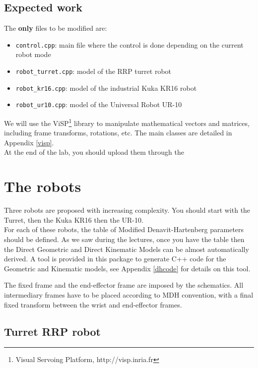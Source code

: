 \documentclass{ecnreport}
\begin{document}
\subsection{Expected work}

The {\bf only} files to be modified are:
\begin{itemize}
	\item \texttt{control.cpp}: main file where the control is done depending on the current robot mode
	\item \texttt{robot\_turret.cpp}: model of the RRP turret robot
	\item \texttt{robot\_kr16.cpp}: model of the industrial Kuka KR16 robot
	\item \texttt{robot\_ur10.cpp}: model of the Universal Robot UR-10
\end{itemize}
We will use the ViSP\footnote{Visual Servoing Platform, http://visp.inria.fr} library to manipulate mathematical vectors and matrices, including frame transforms, rotations, etc. The main classes are detailed in Appendix \ref{visp}.\\
At the end of the lab, you should upload them through the 

\section{The robots}

\def\wMe{{}^w\M_e}

Three robots are proposed with increasing complexity. You should start with the Turret, then the Kuka KR16 then the UR-10.\\
For each of these robots, the table of Modified Denavit-Hartenberg parameters should be defined. As we saw during the lectures, once you have the table then the Direct Geometric and Direct Kinematic Models can be almost automatically derived. A tool is provided in this package to generate C++ code for the Geometric and Kinematic models, see Appendix \ref{dhcode} for details on this tool.

The fixed frame and the end-effector frame are imposed by the schematics. 
All intermediary frames have to be placed according to MDH convention, with a final fixed transform between the wrist and end-effector frames.

\subsection{Turret RRP robot}
\end{document}
